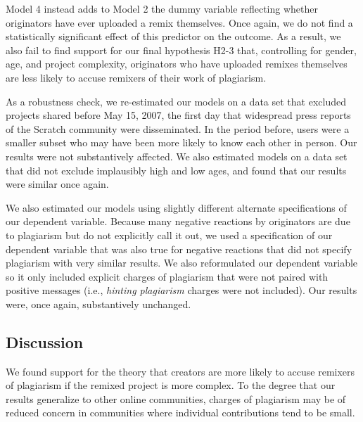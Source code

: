 Model 4 instead adds to Model 2 the dummy variable reflecting whether
originators have ever uploaded a remix themselves. Once again, we do not
find a statistically significant effect of this predictor on the
outcome. As a result, we also fail to find support for our final
hypothesis H2-3 that, controlling for gender, age, and project
complexity, originators who have uploaded remixes themselves are less
likely to accuse remixers of their work of plagiarism.

As a robustness check, we re-estimated our models on a data set that
excluded projects shared before May 15, 2007, the first day that
widespread press reports of the Scratch community were disseminated. In
the period before, users were a smaller subset
who may have been more likely to know each other in person. Our results
were not substantively affected. We also estimated models on a data set
that did not exclude implausibly high and low ages, and found that our
results were similar once again.

We also estimated our models using slightly different alternate
specifications of our dependent variable. Because many negative
reactions by originators are due to plagiarism but do not explicitly
call it out, we used a specification of our dependent variable that was
also true for negative reactions that did not specify plagiarism with
very similar results. We also reformulated our dependent variable so it
only included explicit charges of plagiarism that were not paired with
positive messages (i.e., {\em hinting plagiarism} charges were not
included). Our results were, once again, substantively unchanged.



\subsection{Discussion}

We found support for the theory that creators are more likely to accuse
remixers of plagiarism if the remixed project is more complex.  To the
degree that our results generalize to other online communities, charges
of plagiarism may be of reduced concern in communities where individual
contributions tend to be small.

